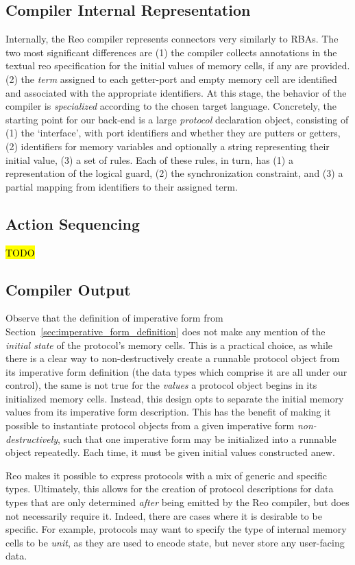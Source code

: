 \subsection{Compiler Internal Representation}
Internally, the Reo compiler represents connectors very similarly to RBAs. The two most significant differences are (1) the compiler collects annotations in the textual reo specification for the initial values of memory cells, if any are provided. (2) the \textit{term} assigned to each getter-port and empty memory cell are identified and associated with the appropriate identifiers. At this stage, the behavior of the compiler is \textit{specialized} according to the chosen target language. Concretely, the starting point for our back-end is a large \textit{protocol} declaration object, consisting of (1) the `interface', with port identifiers and whether they are putters or getters, (2) identifiers for memory variables and optionally a string representing their initial value, (3) a set of rules. Each of these rules, in turn, has (1) a representation of the logical guard, (2) the synchronization constraint, and (3) a partial mapping from identifiers to their assigned term.

\subsection{Action Sequencing}
\hl{TODO}


\subsection{Compiler Output}
Observe that the definition of imperative form from Section~\ref{sec:imperative_form_definition} does not make any mention of the \textit{initial state} of the protocol's memory cells. This is a practical choice, as while there is a clear way to non-destructively create a runnable protocol object from its imperative form definition (the data types which comprise it are all under our control), the same is not true for the \textit{values} a protocol object begins in its initialized memory cells. Instead, this design opts to separate the initial memory values from its imperative form description. This has the benefit of making it possible to instantiate protocol objects from a given imperative form \textit{non-destructively}, such that one imperative form may be initialized into a runnable object repeatedly. Each time, it must be given initial values constructed anew.

Reo makes it possible to express protocols with a mix of generic and specific types. Ultimately, this allows for the creation of protocol descriptions for data types that are only determined \textit{after} being emitted by the Reo compiler, but does not necessarily require it. Indeed, there are cases where it is desirable to be specific. For example, protocols may want to specify the type of internal memory cells to be \textit{unit}, as they are used to encode state, but never store any user-facing data. 

